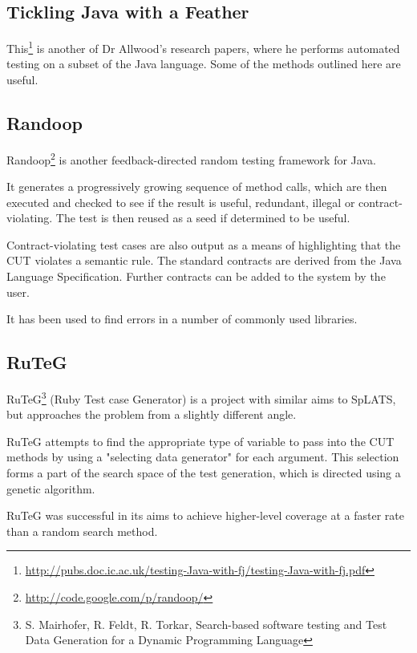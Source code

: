   \subsection{Tickling Java with a Feather}
    This\footnote{\url{http://pubs.doc.ic.ac.uk/testing-Java-with-fj/testing-Java-with-fj.pdf}} is another of Dr Allwood's research papers, where he performs automated testing on a subset of the Java language.
    Some of the methods outlined here are useful.

  \subsection{Randoop}
    Randoop\footnote{\url{http://code.google.com/p/randoop/}} is another
feedback-directed random testing framework for Java.

    It generates a progressively growing sequence of method calls, which are
then executed and checked to see if the result is useful, redundant, illegal or
contract-violating. The test is then reused as a seed if determined to be
useful.

    Contract-violating test cases are also output as a means of highlighting
that the CUT violates a semantic rule. The standard contracts are derived from
the Java Language Specification. Further contracts can be added to the system by
the user.

    It has been used to find errors in a number of commonly used libraries.

  \subsection{RuTeG}
    RuTeG\footnote{S. Mairhofer, R. Feldt, R. Torkar, Search-based software
testing and Test Data Generation for a Dynamic Programming Language} (Ruby Test
case Generator) is a project with similar aims to SpLATS, but approaches the
problem from a slightly different angle.

RuTeG attempts to find the appropriate type of variable to pass into the CUT
methods by using a "selecting data generator" for each argument. This selection
forms a part of the search space of the test generation, which is directed using
a genetic algorithm.

RuTeG was successful in its aims to achieve higher-level coverage at a faster
rate than a random search method.
